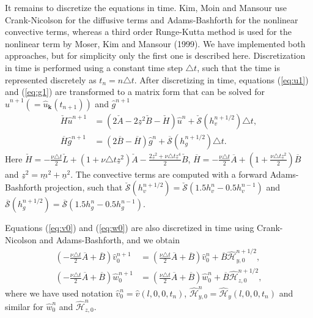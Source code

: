 \documentclass[11pt, oneside]{article}
\newcommand{\N}[1]{\check{#1}}
\newcommand{\D}[1]{\overline{#1}}
\begin{document}
It remains to discretize the equations in time. Kim, Moin and Mansour use 
Crank-Nicolson for the diffusive terms and Adams-Bashforth for the nonlinear 
convective terms, whereas a third order Runge-Kutta method is used for the 
nonlinear term by Moser, Kim and Mansour (1999). We have implemented both 
approaches, but for simplicity only the first one is described here. 
Discretization in time is performed using a constant time step $\triangle t$, 
such that the time is represented discretely as $t_n = n \triangle t$. After 
discretizing in time, equations (\ref{eq:u1}) and (\ref{eq:g1}) are transformed 
to a matrix form that can be solved for $\hat{u}^{n+1} (= 
\hat{u}_{\bm{k}}(t_{n+1}))$ and $\hat{g}^{n+1}$
\begin{align}
\N{H}\hat{u}^{n+1} & = \left(2\N{A} - 2\underline{z}^2\N{B} - \N{H} 
\right)\hat{u}^{n} + \N{\mathcal{S}}(h_v^{n+1/2}) \triangle t, 
\label{eq:ufin}\\ 
\D{H} \hat{g}^{n+1} &= \left(2 \D{B}-\D{H}\right) 
\hat{g}^{n} + \D{\mathcal{S}}(h_g^{n+1/2}) \triangle t. \label{eq:gfin}
\end{align}
Here $\N{H} = -\frac{\nu \triangle t}{2}\N{L} + \left( 1 + \nu \triangle t 
\underline{z}^2 \right) \N{A} - \frac{2\underline{z}^2 + \nu \triangle t 
\underline{z}^4}{2} \N{B}$, $\D{H} = -\frac{\nu \triangle t}{2}\D{A} + (1 + 
\frac{\nu \triangle t \underline{z}^2}{2}) \D{B}$ and $\underline{z}^2 = 
\underline{m}^2 + \underline{n}^2$. The convective terms are computed with 
a forward Adams-Bashforth projection, such that $\N{\mathcal{S}}(h_v^{n+1/2}) = 
\N{\mathcal{S}}(1.5h_v^{n} - 0.5 h_v^{n-1})$ and $\D{\mathcal{S}}(h_g^{n+1/2}) 
= \D{\mathcal{S}}(1.5h_g^{n} - 0.5 h_g^{n-1})$.

Equations (\ref{eq:v0}) and (\ref{eq:w0}) are also discretized in time using 
Crank-Nicolson and Adams-Bashforth, and we obtain
\begin{align}
\left(-\frac{\nu \triangle t}{2}\D{A} + \D{B} \right)\hat{v}_0^{n+1} &= 
\left(\frac{\nu \triangle t}{2}\D{A} + \D{B} 
\right)\hat{v}^{n}_0 + \D{B}\hat{\mathcal{H}}_{y,0}^{n+1/2}, \label{eq:v00} \\
\left(-\frac{\nu \triangle t}{2}\D{A} + \D{B} \right)\hat{w}_0^{n+1} &= 
\left(\frac{\nu \triangle t}{2}\D{A} + \D{B} 
\right)\hat{w}^{n}_0 + \D{B}\hat{\mathcal{H}}_{z,0}^{n+1/2}, \label{eq:w00}
\end{align}
where we have used notation $\hat{v}^{n}_0 = \hat{v}(l, 0, 0, t_n)$, 
$\hat{\mathcal{H}}^{n}_{y,0} = \hat{\mathcal{H}}_y(l, 0, 0, t_n)$ and similar 
for $\hat{w}^n_0$ and $\hat{\mathcal{H}}^n_{z,0}$.
\end{document}
